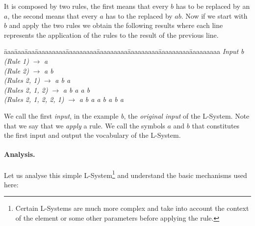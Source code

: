 It is composed by two rules, the first means that every $b$ has to
be replaced by an $a$, the second means that every $a$ has to the
replaced by $ab$. Now if we start with $b$ and apply the two rules
we obtain the following results where each line represents the
application of the rules to the result of the previous line.

\begin{tabbing}
\=aaa\=aaa\=aaa\=aaaaaaaaa\=aaaaaaaaa\=aaaaaaaaa\=aaaaaaaaa\=aaaaaaaaa\=aaaaaaaaa\kill
\>\>\>\> \emph{Input} \>\> \emph{b}\\
\>\>\>\> \emph{(Rule 1)} \>\> $\rightarrow$ \emph{a }\\
\>\>\>\> \emph{(Rule 2)} \>\> $\rightarrow$ \emph{a b}  \\
\>\>\>\> \emph{(Rules 2, 1)} \>\> $\rightarrow$  \emph{a b a}  \\
\>\>\>\> \emph{(Rules 2, 1, 2)} \>\>$\rightarrow$ \emph{a b a a b}  \\
\>\>\>\> \emph{(Rules 2, 1, 2, 2, 1)} \>\>$\rightarrow$ \emph{a b a a b a b a} 
\end{tabbing}

We call the first \emph{input}, in the example \emph{b}, the \emph{original input} of the L-System. Note that we say that we \emph{apply} a rule. We call the symbols $a$ and $b$ that constitutes the first input and output the vocabulary of the L-System.

\paragraph{Analysis.}
Let us analyse this simple L-System\footnote{Certain L-Systems are
much more complex and take into account the context of the element or
some other parameters before applying the rule.} and understand the
basic mechanisms used here:

